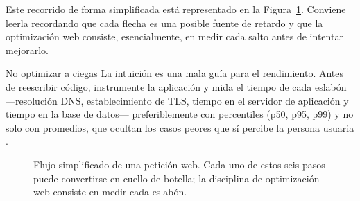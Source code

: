 Este recorrido de forma simplificada está representado en la Figura~\ref{fig:flujo-web}. Conviene leerla recordando que cada flecha es una posible fuente de retardo y que la optimización web consiste, esencialmente, en medir cada salto antes de intentar mejorarlo.

\begin{cajaadvertencia}{No optimizar a ciegas}
	La intuición es una mala guía para el rendimiento. Antes de reescribir código, instrumente la aplicación y mida el tiempo de cada eslabón ---resolución DNS, establecimiento de TLS, tiempo en el servidor de aplicación y tiempo en la base de datos--- preferiblemente con percentiles (p50, p95, p99) y no solo con promedios, que ocultan los casos peores que sí percibe la persona usuaria \cite{grigorik2013hpbn,kleppmann2017designing}.
\end{cajaadvertencia}

\begin{figure}[htbp]
\centering
{}
\caption{Flujo simplificado de una petición web. Cada uno de estos seis pasos puede convertirse en cuello de botella; la disciplina de optimización web consiste en medir cada eslabón.}
\label{fig:flujo-web}
\end{figure}

